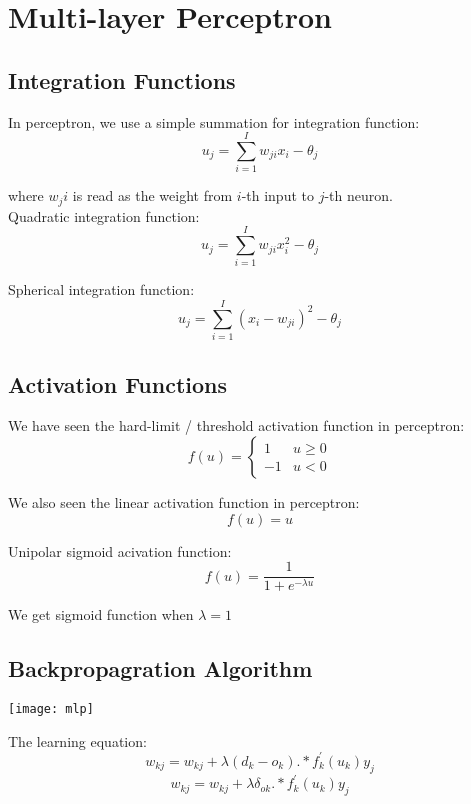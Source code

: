 \chapter{Multi-layer Perceptron}

\begin{multicols}{2}

\section{Integration Functions}

\noindent In perceptron, we use a simple summation for integration function:
$$u_j = \sum_{i=1}^I w_{ji}x_i - \theta_j$$

\noindent where $w_ji$ is read as the weight from $i$-th input to $j$-th neuron. \\

\noindent Quadratic integration function:
$$u_j = \sum_{i=1}^I w_{ji}x_i^2 - \theta_j$$

\noindent Spherical integration function:
$$u_j = \sum_{i=1}^I ( x_i - w_{ji})^2 - \theta_j$$

\section{Activation Functions}

\noindent We have seen the hard-limit / threshold activation function in perceptron:
$$
f(u) = 
\begin{cases}
1 & u \ge 0\\
-1 & u < 0
\end{cases}
$$

\noindent We also seen the linear activation function in perceptron:
$$f(u) = u$$

\noindent Unipolar sigmoid acivation function:
$$f(u) = \frac{1}{1+e^{-\lambda u}}$$

\noindent We get sigmoid function when $\lambda=1$

\section{Backpropagration Algorithm}

\begin{center}
\texttt{[image: mlp]}
\end{center}

\noindent The learning equation:
$$w_{kj} = w_{kj} + \lambda (d_k - o_k) .* f_k^{'}(u_k) y_j$$
$$w_{kj} = w_{kj} + \lambda \delta_{ok} .* f_k^{'}(u_k) y_j$$


\end{multicols}
